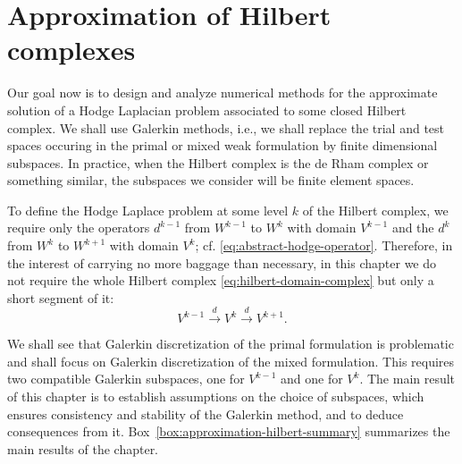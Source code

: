 \clearpage\setcounter{section}{4}
\section{{Approximation of Hilbert complexes}}\label{chap:approximation-hilbert-complexes}

{Our goal now is to design and analyze numerical methods for the approximate solution of a Hodge Laplacian problem associated to some closed Hilbert complex. We shall use Galerkin methods, i.e., we shall replace the trial and test spaces occuring in the primal or mixed weak formulation by finite dimensional subspaces. In practice, when the Hilbert complex is the de Rham complex or something similar, the subspaces we consider will be finite element spaces.}

{To define the Hodge Laplace problem at some level $k$ of the Hilbert complex, we require only the operators $d^{k-1}$ from $W^{k-1}$ to $W^k$ with domain $V^{k-1}$ and the $d^k$ from $W^k$ to $W^{k+1}$ with domain $V^k$; cf. \eqref{eq:abstract-hodge-operator}. Therefore, in the interest of carrying no more baggage than necessary, in this chapter we do not require the whole Hilbert complex \eqref{eq:hilbert-domain-complex} but only a short segment of it:}
\begin{equation}\label{eq:approximation-short-complex}
V^{k-1}\xrightarrow{d}V^k\xrightarrow{d}V^{k+1}.
\end{equation}

{We shall see that Galerkin discretization of the primal formulation is problematic and shall focus on Galerkin discretization of the mixed formulation. This requires two compatible Galerkin subspaces, one for $V^{k-1}$ and one for $V^k$. The main result of this chapter is to establish assumptions on the choice of subspaces, which ensures consistency and stability of the Galerkin method, and to deduce consequences from it. Box~\ref{box:approximation-hilbert-summary} summarizes the main results of the chapter.}
